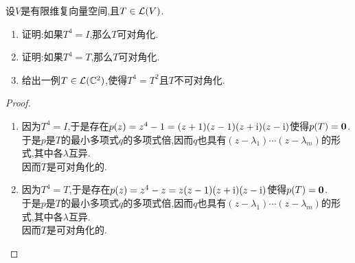 \documentclass{ctexart}
\begin{document}
\pagestyle{empty}
\begin{center}
    \large{}
\end{center}
\begin{problem}[1.]
    设$V$是有限维复向量空间,且$T\in\mathcal{L}(V)$.
    \begin{enumerate}[label=\tbf{(\arabic*)}]
        \item 证明:如果$T^4=I$,那么$T$可对角化.
        \item 证明:如果$T^4=T$,那么$T$可对角化.
        \item 给出一例$T\in\mathcal{L}(\mathbb{C}^2)$,使得$T^4=T^2$且$T$不可对角化.
    \end{enumerate}
\end{problem}
\begin{proof}
    \begin{enumerate}[label=\tbf{(\arabic*)}]
        \item 因为$T^4=I$,于是存在$p(z)=z^4-1=(z+1)(z-1)(z+\text{i})(z-\text{i})$使得$p(T)=\mathbf0$.\\
            于是$p$是$T$的最小多项式$q$的多项式倍,因而$q$也具有$(z-\lambda_1)\cdots(z-\lambda_m)$的形式,其中各$\lambda$互异.\\
            因而$T$是可对角化的.
        \item 因为$T^4=T$,于是存在$p(z)=z^4-z=z(z-1)(z+\text{i})(z-\text{i})$使得$p(T)=\mathbf0$.\\
            于是$p$是$T$的最小多项式$q$的多项式倍,因而$q$也具有$(z-\lambda_1)\cdots(z-\lambda_m)$的形式,其中各$\lambda$互异.\\
            因而$T$是可对角化的.
    \end{enumerate}
\end{proof}
\end{document}
